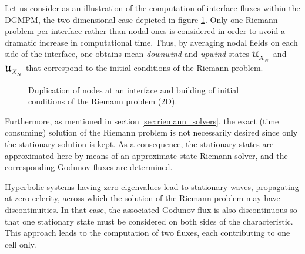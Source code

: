 Let us consider as an illustration of the computation of interface fluxes within the DGMPM, the two-dimensional case depicted in figure \ref{fig:2D_edge}.
Only one Riemann problem per interface rather than nodal ones is considered in order to avoid a dramatic increase in computational time.
Thus, by averaging nodal fields on each side of the interface, one obtains mean \textit{downwind} and \textit{upwind} states ${\boldsymbol{\mathcal{U}}}_{X_N^-}$ and ${\boldsymbol{\mathcal{U}}}_{X_N^+}$ that correspond to the initial conditions of the Riemann problem.
\begin{figure}[h!]
  \centering
  
  \caption{Duplication of nodes at an interface and building of initial conditions of the Riemann problem (2D).}
  \label{fig:2D_edge}
\end{figure}
Furthermore, as mentioned in section \ref{sec:riemann_solvers}, the exact (time consuming) solution of the Riemann problem is not necessarily desired since only the stationary solution is kept. As a consequence, the stationary states are approximated here by means of an approximate-state Riemann solver, and the corresponding Godunov fluxes are determined.
\begin{remark}
  Hyperbolic systems having zero eigenvalues lead to stationary waves, propagating at zero celerity, across which the solution of the Riemann problem may have discontinuities. In that case, the associated Godunov flux is also discontinuous so that one stationary state must be considered on both sides of the characteristic. This approach leads to the computation of two fluxes, each contributing to one cell only. 
\end{remark}

